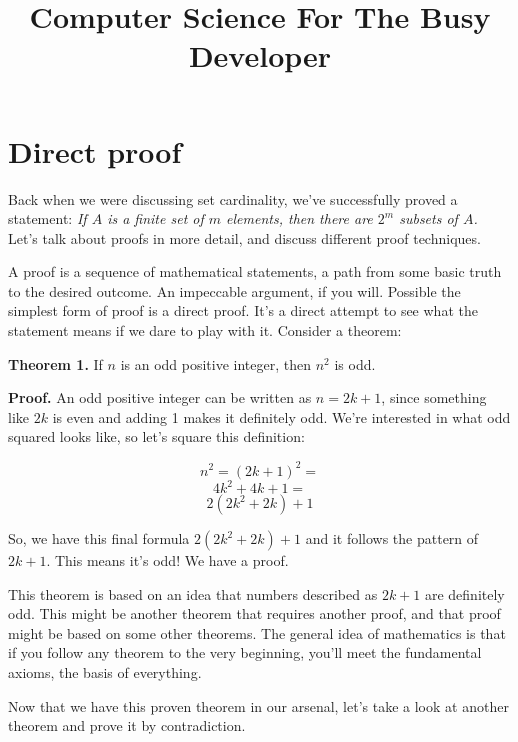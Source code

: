 \documentclass[a4paper, justified, notitlepage, sfsidenotes, notoc]{tufte-book}
\date{}
\title{Computer Science For The Busy Developer}
\begin{document}
\part{Direct proof}
\label{sec:org243cb8d}

Back when we were discussing set cardinality, we've successfully proved a statement: \emph{If \(A\) is a finite set of \(m\) elements, then there are \(2^{m}\) subsets of \(A\).} Let's talk about proofs in more detail, and discuss different proof techniques.

A proof is a sequence of mathematical statements, a path from some basic truth to the desired outcome. An impeccable argument, if you will. Possible the simplest form of proof is a direct proof. It's a direct attempt to see what the statement means if we dare to play with it. Consider a theorem:

\textbf{Theorem 1.} If \(n\) is an odd positive integer, then \(n^2\) is odd.

\textbf{Proof.} An odd positive integer can be written as \(n = 2k + 1\), since something like \(2k\) is even and adding 1 makes it definitely odd. We're interested in what odd squared looks like, so let's square this definition:

$$ n^2 = (2k + 1)^2 = $$
$$ 4k^2 + 4k + 1 = $$
$$ 2(2k^2 + 2k) + 1 $$

So, we have this final formula \(2(2k^2 + 2k) + 1\) and it follows the pattern of \(2k + 1\). This means it's odd! We have a proof.

This theorem is based on an idea that numbers described as \(2k + 1\) are definitely odd. This might be another theorem that requires another proof, and that proof might be based on some other theorems. The general idea of mathematics is that if you follow any theorem to the very beginning, you'll meet the fundamental axioms, the basis of everything.

Now that we have this proven theorem in our arsenal, let's take a look at another theorem and prove it by contradiction.
\end{document}
